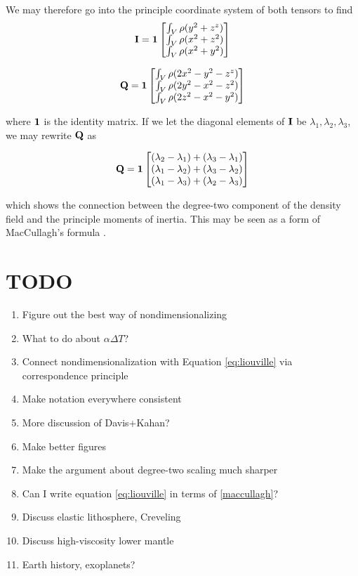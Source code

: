 \documentclass[extra,onecolumn]{gji}
\begin{document}
We may therefore go into the principle coordinate system of both tensors to find
\begin{equation}
{\bf I} = {\bf 1} \begin{bmatrix}
\int_V \rho (y^2+z^z)\\
\int_V \rho (x^2+z^2) \\
\int_V \rho (x^2+y^2) 
\end{bmatrix}
\end{equation}

\begin{equation}
{\bf Q} = {\bf 1} \begin{bmatrix}
\int_V \rho (2 x^2 - y^2 - z^z)\\
\int_V \rho (2 y^2 - x^2 -z^2)\\
\int_V \rho (2 z^2 - x^2 - y^2) 
\end{bmatrix}
\end{equation}

where $\bf 1$ is the identity matrix.  If we let the diagonal elements of $\bf I$ be $\lambda_1, \lambda_2, \lambda_3$, we may rewrite $\bf Q$ as

\begin{equation}
{\bf Q} = {\bf 1} \begin{bmatrix}
(\lambda_2-\lambda_1) + (\lambda_3-\lambda_1)\\
(\lambda_1-\lambda_2) + (\lambda_3-\lambda_2)\\
(\lambda_1-\lambda_3) + (\lambda_2-\lambda_3)\\
\end{bmatrix}
\label{maccullagh}
\end{equation}

which shows the connection between the degree-two component of the density field and the principle moments of inertia.  This may be seen as a form of MacCullagh's formula \citep{munk1960rotation}.


\section {TODO}

\begin{enumerate}
\item Figure out the best way of nondimensionalizing
\item What to do about $\alpha \Delta T$?
\item Connect nondimensionalization with Equation \ref{eq:liouville} via correspondence principle
\item Make notation everywhere consistent
\item More discussion of Davis+Kahan?
\item Make better figures
\item Make the argument about degree-two scaling much sharper
\item Can I write equation \ref{eq:liouville} in terms of \ref{maccullagh}?
\item Discuss elastic lithosphere, Creveling
\item Discuss high-viscosity lower mantle
\item Earth history, exoplanets?
\end{enumerate}

\label{lastpage}
\end{document}
